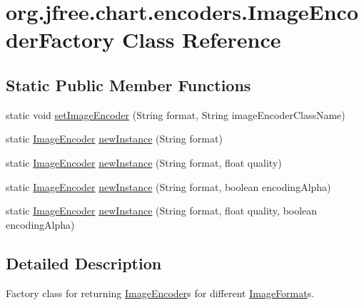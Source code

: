 \hypertarget{classorg_1_1jfree_1_1chart_1_1encoders_1_1_image_encoder_factory}{}\section{org.\+jfree.\+chart.\+encoders.\+Image\+Encoder\+Factory Class Reference}
\label{classorg_1_1jfree_1_1chart_1_1encoders_1_1_image_encoder_factory}
\subsection*{Static Public Member Functions}
\begin{DoxyCompactItemize}
\item 
static void \mbox{\hyperlink{classorg_1_1jfree_1_1chart_1_1encoders_1_1_image_encoder_factory_adb3093ed6e765bd969822c2d013c329d}{set\+Image\+Encoder}} (String format, String image\+Encoder\+Class\+Name)
\item 
static \mbox{\hyperlink{interfaceorg_1_1jfree_1_1chart_1_1encoders_1_1_image_encoder}{Image\+Encoder}} \mbox{\hyperlink{classorg_1_1jfree_1_1chart_1_1encoders_1_1_image_encoder_factory_a01b861e351595b86ac033d0d3d4d6dd7}{new\+Instance}} (String format)
\item 
static \mbox{\hyperlink{interfaceorg_1_1jfree_1_1chart_1_1encoders_1_1_image_encoder}{Image\+Encoder}} \mbox{\hyperlink{classorg_1_1jfree_1_1chart_1_1encoders_1_1_image_encoder_factory_aeafbf46bd8e67122b87ca0136944431f}{new\+Instance}} (String format, float quality)
\item 
static \mbox{\hyperlink{interfaceorg_1_1jfree_1_1chart_1_1encoders_1_1_image_encoder}{Image\+Encoder}} \mbox{\hyperlink{classorg_1_1jfree_1_1chart_1_1encoders_1_1_image_encoder_factory_a954e67f1d2ac26668481d9b2de74ade1}{new\+Instance}} (String format, boolean encoding\+Alpha)
\item 
static \mbox{\hyperlink{interfaceorg_1_1jfree_1_1chart_1_1encoders_1_1_image_encoder}{Image\+Encoder}} \mbox{\hyperlink{classorg_1_1jfree_1_1chart_1_1encoders_1_1_image_encoder_factory_a74b8d8abeb695ae0a80d2051650274f5}{new\+Instance}} (String format, float quality, boolean encoding\+Alpha)
\end{DoxyCompactItemize}


\subsection{Detailed Description}
Factory class for returning \mbox{\hyperlink{interfaceorg_1_1jfree_1_1chart_1_1encoders_1_1_image_encoder}{Image\+Encoder}}s for different \mbox{\hyperlink{interfaceorg_1_1jfree_1_1chart_1_1encoders_1_1_image_format}{Image\+Format}}s. 

